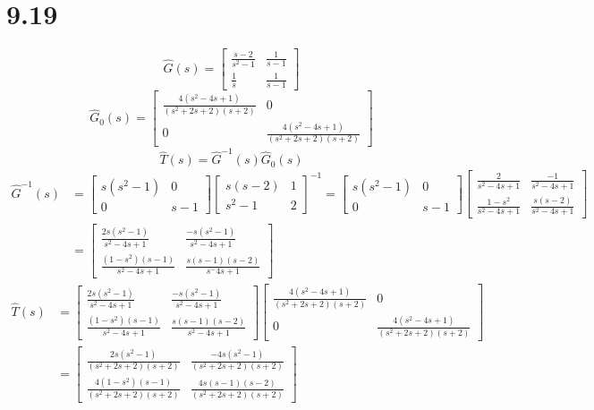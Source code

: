 \documentclass{article}
\begin{document}
\section*{9.19}
\[\hat{G}(s)=
\left[
\begin{array}{cc}
    \frac{s-2}{s^2-1} & \frac{1}{s-1}\\
    \frac{1}{s} & \frac{1}{s-1}
\end{array}
\right]
\]
\[\hat{G}_0(s)=
\left[
\begin{array}{cc}
    \frac{4(s^2-4s+1)}{(s^2+2s+2)(s+2)} & 0\\
    0 & \frac{4(s^2-4s+1)}{(s^2+2s+2)(s+2)} 
\end{array}
\right]
\]
\[\hat{T}(s)=\hat{G}^{-1}(s)\hat{G}_0(s)\]
\[
    \begin{split}    
\hat{G}^{-1}(s)&=
\left[
\begin{array}{cc}
  s(s^2-1) & 0 \\
    0 & s-1
\end{array}
\right]\left[ 
    \begin{array}{cc}
    s(s-2) & 1\\
    s^2-1 & 2
    \end{array}
\right]^{-1}=\left[ 
    \begin{array}{cc}
        s(s^2-1) & 0\\
        0 & s-1
    \end{array}
\right]
\left[ 
    \begin{array}{cc}
        \frac{2}{s^2-4s+1} & \frac{-1}{s^2-4s+1}\\
        \frac{1-s^2}{s^2-4s+1} & \frac{s(s-2)}{s^2-4s+1}
    \end{array}
\right] \\
&=\left[ 
    \begin{array}{cc}
        \frac{2s(s^2-1)}{s^2-4s+1} & \frac{-s(s^2-1)}{s^2-4s+1}\\
        \frac{(1-s^2)(s-1)}{s^2-4s+1} & \frac{s(s-1)(s-2)}{s^-4s+1}
    \end{array}
\right]
\end{split}
\]
\[ 
\begin{split}
\hat{T}(s)
& =\left[ 
    \begin{array}{cc}
        \frac{2s(s^2-1)}{s^2-4s+1} & \frac{-s(s^2-1)}{s^2-4s+1}\\
        \frac{(1-s^2)(s-1)}{s^2-4s+1} & \frac{s(s-1)(s-2)}{s^2-4s+1}
    \end{array}
\right]
\left[ 
    \begin{array}{cc}
        \frac{4(s^2-4s+1)}{(s^2+2s+2)(s+2)} & 0\\
        0 & \frac{4(s^2-4s+1)}{(s^2+2s+2)(s+2)}
    \end{array}
\right] \\
&=\left[ 
    \begin{array}{cc}
        \frac{2s(s^2-1)}{(s^2+2s+2)(s+2)} & \frac{-4s(s^2-1)}{(s^2+2s+2)(s+2)}\\
        \frac{4(1-s^2)(s-1)}{(s^2+2s+2)(s+2)} & \frac{4s(s-1)(s-2)}{(s^2+2s+2)(s+2)}
    \end{array}
\right]
\end{split}
\]
\end{document}
